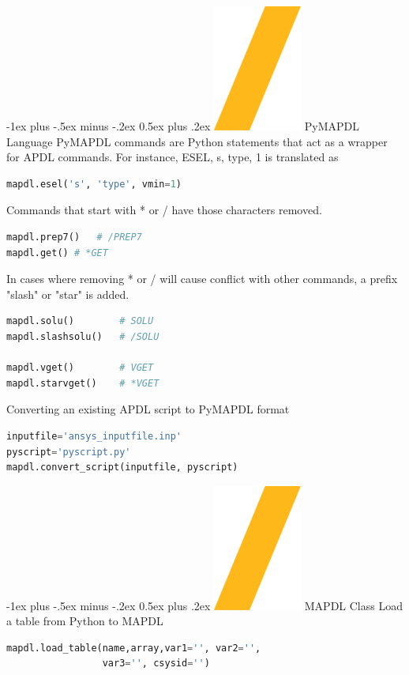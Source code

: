 \documentclass[9pt,landscape]{article}
\makeatletter
\renewcommand{\section}{\@startsection{section}{1}{0mm}%
                                {-1ex plus -.5ex minus -.2ex}%
                                {0.5ex plus .2ex}%
                                {\normalfont\large\bfseries}}
\def\code#1{\textit{}{#1}}
\makeatother
\begin{document}
\begin{multicols}{3}
\section{\includegraphics[height=\fontcharht\font`\S]{slash.png} PyMAPDL Language}
PyMAPDL commands are Python statements that act as a wrapper for APDL commands. For instance, \code{ESEL, s, type, 1} is translated as
\begin{lstlisting}[language=Python]
mapdl.esel('s', 'type', vmin=1) 
\end{lstlisting}

Commands that start with * or / have those characters removed.
\begin{lstlisting}[language=Python]
mapdl.prep7()	# /PREP7
mapdl.get()	# *GET
\end{lstlisting}

In cases where removing * or / will cause conflict with other commands, a prefix "slash" or "star" is added.
\begin{lstlisting}[language=Python]
mapdl.solu()		# SOLU
mapdl.slashsolu()	# /SOLU

mapdl.vget()		# VGET
mapdl.starvget()	# *VGET
\end{lstlisting} 

\columnbreak
Converting an existing APDL script to PyMAPDL format
\begin{lstlisting}[language=Python]
inputfile='ansys_inputfile.inp'
pyscript='pyscript.py'
mapdl.convert_script(inputfile, pyscript)
\end{lstlisting} 

\section{\includegraphics[height=\fontcharht\font`\S]{slash.png} MAPDL Class}
Load a table from Python to MAPDL
\begin{lstlisting}[language=Python]
mapdl.load_table(name,array,var1='', var2='',
                 var3='', csysid='')
\end{lstlisting} 


\end{multicols}
\end{document}
